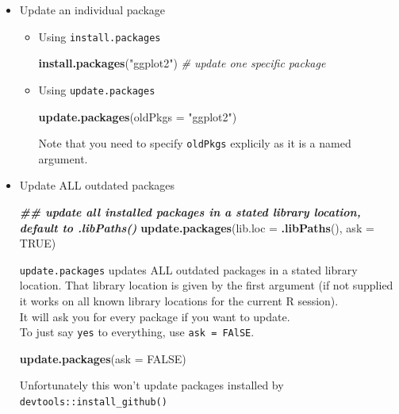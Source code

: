 \documentclass[
  a4paper,
  twoside,
  openright]{book}
\newenvironment{Shaded}{\begin{snugshade}}{\end{snugshade}}
\newcommand{\AttributeTok}[1]{\textcolor[rgb]{0.13,0.29,0.53}{#1}}
\newcommand{\CommentTok}[1]{\textcolor[rgb]{0.56,0.35,0.01}{\textit{#1}}}
\newcommand{\ConstantTok}[1]{\textcolor[rgb]{0.56,0.35,0.01}{#1}}
\newcommand{\DocumentationTok}[1]{\textcolor[rgb]{0.56,0.35,0.01}{\textbf{\textit{#1}}}}
\newcommand{\FunctionTok}[1]{\textcolor[rgb]{0.13,0.29,0.53}{\textbf{#1}}}
\newcommand{\NormalTok}[1]{#1}
\newcommand{\StringTok}[1]{\textcolor[rgb]{0.31,0.60,0.02}{#1}}
\theoremstyle{definition}
\theoremstyle{definition}
\theoremstyle{definition}
\theoremstyle{definition}
\theoremstyle{remark}
\begin{document}
\begin{itemize}
\item
  Update an individual package

  \begin{itemize}
  \item
    Using \texttt{install.packages}

\begin{Shaded}
\begin{Highlighting}[]
\FunctionTok{install.packages}\NormalTok{(}\StringTok{"ggplot2"}\NormalTok{) }\CommentTok{\# update one specific package}
\end{Highlighting}
\end{Shaded}
  \item
    Using \texttt{update.packages}

\begin{Shaded}
\begin{Highlighting}[]
\FunctionTok{update.packages}\NormalTok{(}\AttributeTok{oldPkgs =} \StringTok{"ggplot2"}\NormalTok{)}
\end{Highlighting}
\end{Shaded}

    Note that you need to {specify \texttt{oldPkgs} explicily} as it is a named argument.
  \end{itemize}
\item
  Update ALL outdated packages

\begin{Shaded}
\begin{Highlighting}[]
\DocumentationTok{\#\# update all installed packages in a stated library location, default to \textasciigrave{}.libPaths()\textasciigrave{}}
\FunctionTok{update.packages}\NormalTok{(}\AttributeTok{lib.loc =} \FunctionTok{.libPaths}\NormalTok{(), }\AttributeTok{ask =} \ConstantTok{TRUE}\NormalTok{) }
\end{Highlighting}
\end{Shaded}

  \texttt{update.packages} updates ALL outdated packages in a stated library location. That library location is given by the first argument (if not supplied it works on all known library locations for the current R session).\\
  It will ask you for every package if you want to update.\\
  To just say \texttt{yes} to everything, use \texttt{ask\ =\ FAlSE}.

\begin{Shaded}
\begin{Highlighting}[]
\FunctionTok{update.packages}\NormalTok{(}\AttributeTok{ask =} \ConstantTok{FALSE}\NormalTok{)}
\end{Highlighting}
\end{Shaded}

  Unfortunately this {won't} update packages installed by \texttt{devtools::install\_github()}
\end{itemize}
\end{document}
